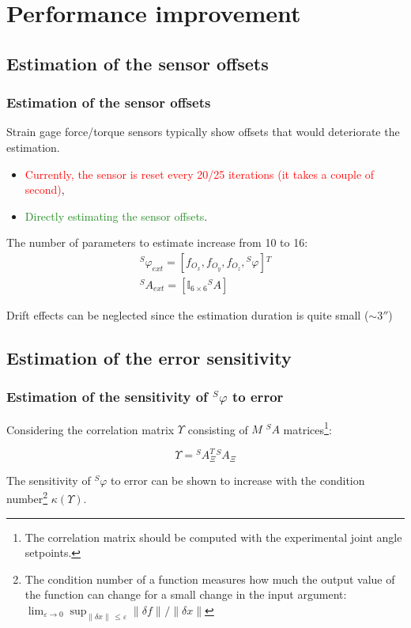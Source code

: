 \documentclass[usenames,dvipsnames]{beamer}
\begin{document}
\section{Performance improvement}
\subsection{Estimation of the sensor offsets}

\begin{frame}
 \frametitle{Estimation of the sensor offsets}
 Strain gage force/torque sensors typically show offsets that would deteriorate the estimation.

 \begin{itemize}
  \item \textcolor{red}{Currently, the sensor is reset every 20/25 iterations (it takes a couple of second)},
  \item \textcolor{ForestGreen}{Directly estimating the sensor offsets}.
 \end{itemize}

 The number of parameters to estimate increase from 10 to 16:
 \begin{gather}
  {}^S \varphi_{ext} = [f_{O_x}, f_{O_y}, f_{O_z}, {}^S \varphi] {}^T \\
  {}^S A_{ext} = [\mathbb{I}_{6 \times 6} {}^S A]
 \end{gather}

 {\footnotesize Drift effects can be neglected since the estimation duration is quite small ($\sim 3 \second$)}
\end{frame}


\subsection{Estimation of the error sensitivity}

\begin{frame}
 \frametitle{Estimation of the sensitivity of ${}^S \varphi$ to error}

 Considering the correlation matrix $\Upsilon$ consisting of $M$ ${}^S A$ matrices\footnote{The correlation matrix should be computed with the experimental joint angle setpoints.}:

 \begin{equation}
  \Upsilon = {}^S A_{\Xi}^T {}^S A_{\Xi}
 \end{equation}

 The sensitivity of ${}^S \varphi$ to error can be shown to increase with the condition number\footnote{The condition number of a function measures how much the output value of the function can change for a small change in the input argument: $\lim_{\varepsilon \rightarrow 0} \sup _{\|\delta x \|\ \leq \varepsilon} \| \delta f \| ^{}/ \| \delta x \|$ } $\kappa(\Upsilon)$.

\end{frame}
\end{document}
